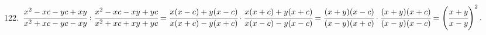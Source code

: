 122. $\cfrac{x^2-xc-yc+xy}{x^2+xc-yc-xy}:\cfrac{x^2-xc-xy+yc}{x^2+xc+xy+yc}=\cfrac{x(x-c)+y(x-c)}{x(x+c)-y(x+c)}\cdot\cfrac{x(x+c)+y(x+c)}{x(x-c)-y(x-c)}=
\cfrac{(x+y)(x-c)}{(x-y)(x+c)}\cdot\cfrac{(x+y)(x+c)}{(x-y)(x-c)}=\left(\cfrac{x+y}{x-y}\right)^2.$\\
